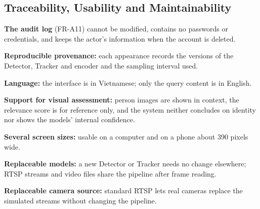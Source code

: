 \subsection{Traceability, Usability and Maintainability}
\label{sec:4.3.5}
\label{sec:4.3.6}
\label{sec:4.3.7}

\begin{reqlist}
    \item[NFR-17] \textbf{The audit log} (FR-A11) cannot be modified, contains no passwords or credentials, and keeps the actor's information when the account is deleted.
    \item[NFR-18] \textbf{Reproducible provenance:} each appearance records the versions of the Detector, Tracker and encoder and the sampling interval used.
    \item[NFR-19] \textbf{Language:} the interface is in Vietnamese; only the query content is in English.
    \item[NFR-20] \textbf{Support for visual assessment:} person images are shown in context, the relevance score is for reference only, and the system neither concludes on identity nor shows the models' internal confidence.
    \item[NFR-21] \textbf{Several screen sizes:} usable on a computer and on a phone about 390 pixels wide.
    \item[NFR-22] \textbf{Replaceable models:} a new Detector or Tracker needs no change elsewhere; RTSP streams and video files share the pipeline after frame reading.
    \item[NFR-23] \textbf{Replaceable camera source:} standard RTSP lets real cameras replace the simulated streams without changing the pipeline.
\end{reqlist}
